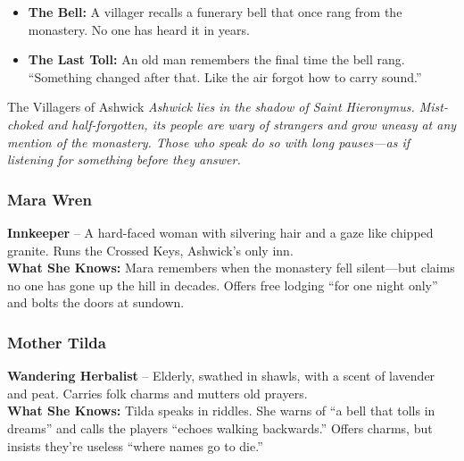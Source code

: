 \documentclass[twocolumn,nodeprecatedcode,bg=print]{dndbook/dndbook}
\begin{document}
\begin{WyrdExample}
    \begin{itemize}
        \item \textbf{The Bell:} A villager recalls a funerary bell that once rang from the monastery. No one has heard it in years.
        \item \textbf{The Last Toll:} An old man remembers the final time the bell rang. “Something changed after that. Like the air forgot how to carry sound.”
    \end{itemize}
\end{WyrdExample}

\begin{WyrdFullNPC}[%
    name=The Villagers of Ashwick,%
    description=The last voices before the silence,%
    float=!t%
]{The Villagers of Ashwick}
    \emph{Ashwick lies in the shadow of Saint Hieronymus. Mist-choked and half-forgotten, its people are wary of strangers and grow uneasy at any mention of the monastery. Those who speak do so with long pauses—as if listening for something before they answer.}

    \vspace{0.5\baselineskip}
    \subsubsection*{Mara Wren}
    \textbf{Innkeeper} – A hard-faced woman with silvering hair and a gaze like chipped granite. Runs the Crossed Keys, Ashwick’s only inn.\\
    \textbf{What She Knows:} Mara remembers when the monastery fell silent—but claims no one has gone up the hill in decades. Offers free lodging “for one night only” and bolts the doors at sundown.

    \vspace{0.5\baselineskip}
    \subsubsection*{Mother Tilda}
    \textbf{Wandering Herbalist} – Elderly, swathed in shawls, with a scent of lavender and peat. Carries folk charms and mutters old prayers.\\
    \textbf{What She Knows:} Tilda speaks in riddles. She warns of “a bell that tolls in dreams” and calls the players “echoes walking backwards.” Offers charms, but insists they’re useless “where names go to die.”

    \vspace{0.5\baselineskip}

\end{WyrdFullNPC}
\end{document}
